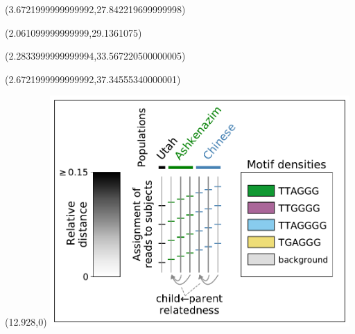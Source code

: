 \documentclass{article}
\begin{document}
\begin{textblock}{13}(3.6721999999999992,27.842219699999998)\end{textblock}
\begin{textblock}{13}(2.061099999999999,29.1361075)\end{textblock}
\begin{textblock}{13}(2.2833999999999994,33.567220500000005)\end{textblock}
\begin{textblock}{13}(2.6721999999999992,37.34555340000001)\end{textblock}
\begin{textblock}{13}(12.928,0)
\includegraphics[width=4.500in,keepaspectratio]{latex/figures/haplotypes/haplotypes-legend.pdf}
\end{textblock}
\end{document}
